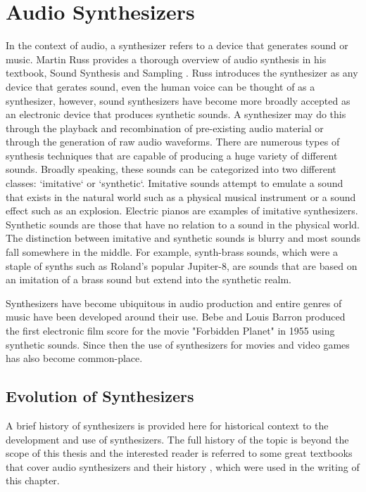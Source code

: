\graphicspath{{./}{./figures/}{./figures/background/}}

\section{Audio Synthesizers}
In the context of audio, a synthesizer refers to a device that generates sound or music. Martin Russ provides a thorough overview of audio synthesis in his textbook, Sound Synthesis and Sampling \cite{russ2012sound}. Russ introduces the synthesizer as any device that gerates sound,  even the human voice can be thought of as a synthesizer, however, sound synthesizers have become more broadly accepted as an electronic device that produces synthetic sounds. A synthesizer may do this through the playback and recombination of pre-existing audio material or through the generation of raw audio waveforms. There are numerous types of synthesis techniques that are capable of producing a huge variety of different sounds. Broadly speaking, these sounds can be categorized into two different classes: `imitative` or `synthetic`. Imitative sounds attempt to emulate a sound that exists in the natural world such as a physical musical instrument or a sound effect such as an explosion. Electric pianos are examples of imitative synthesizers. Synthetic sounds are those that have no relation to a sound in the physical world. The distinction between imitative and synthetic sounds is blurry and most sounds fall somewhere in the middle. For example, synth-brass sounds, which were a staple of synths such as Roland's popular Jupiter-8, are sounds that are based on an imitation of a brass sound but extend into the synthetic realm. 

Synthesizers have become ubiquitous in audio production and entire genres of music have been developed around their use. Bebe and Louis Barron produced the first electronic film score for the movie "Forbidden Planet" in 1955 using synthetic sounds. Since then the use of synthesizers for movies and video games has also become common-place.


\subsection{Evolution of Synthesizers}
A brief history of synthesizers is provided here for historical context to the development and use of synthesizers. The full history of the topic is beyond the scope of this thesis and the interested reader is referred to some great textbooks that cover audio synthesizers and their history \cite{roads1980interview, mcguire2015musical, jenkins2019analog, russ2012sound}, which were used in the writing of this chapter.
